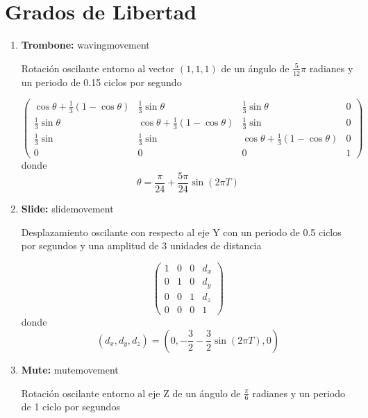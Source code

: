 \documentclass[10pt, a4paper]{article}
\begin{document}
\newpage

\section{Grados de Libertad}

\begin{enumerate}
	\item \textbf{Trombone:} wavingmovement
	
	Rotación oscilante entorno al vector $(1, 1, 1)$ de un ángulo de $\frac{5}{12} \pi$ radianes y un periodo de 0.15 ciclos por segundo

	\begin{equation*}
		\begin{pmatrix}
			\cos \theta + \frac{1}{3}(1 - \cos\theta) & \frac{1}{3} \sin \theta & \frac{1}{3} \sin \theta & 0 \\
			\frac{1}{3} \sin \theta & \cos \theta + \frac{1}{3}(1 - \cos \theta) & \frac{1}{3} \sin & 0 \\
			\frac{1}{3} \sin & \frac{1}{3} \sin & \cos \theta + \frac{1}{3} (1 - \cos \theta) & 0 \\
			0 & 0 & 0 & 1
		\end{pmatrix}
	\end{equation*}
	donde
	\begin{equation*}
		\theta = \frac{\pi}{24} + \frac{5\pi}{24} \sin(2 \pi T)
	\end{equation*}
	\item \textbf{Slide:} slidemovement
	
	Desplazamiento oscilante con respecto al eje Y con un periodo de 0.5 ciclos por segundos y una amplitud de 3 unidades de distancia

	\begin{equation*}
		\begin{pmatrix}
			1 & 0 & 0 & d_x \\
			0 & 1 & 0 & d_y \\
			0 & 0 & 1 & d_z \\
			0 & 0 & 0 & 1
		\end{pmatrix}
	\end{equation*}
	donde
	\begin{equation*}
		(d_x, d_y, d_z) = (0, -\frac{3}{2} - \frac{3}{2}\sin(2\pi T), 0)
	\end{equation*}
	\item \textbf{Mute:} mutemovement
	
	Rotación oscilante entorno al eje Z de un ángulo de $\frac{\pi}{6}$ radianes y un periodo de 1 ciclo por segundos


\end{enumerate}
\end{document}
